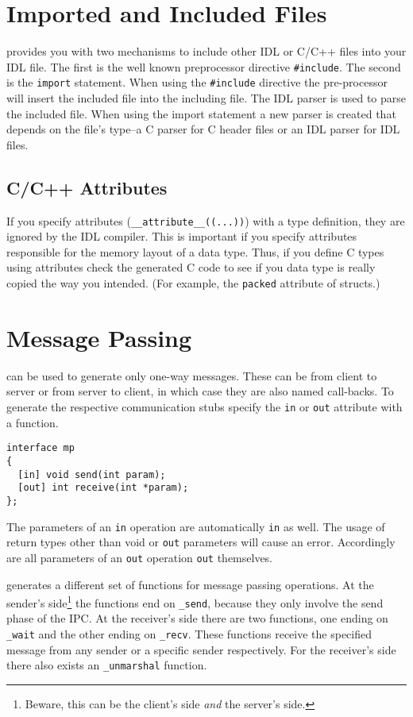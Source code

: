 \section{Imported and Included Files}
\label{sec:import}

\dice{} provides you with two mechanisms to include other IDL or C/C++ files
into your IDL file. The first is the well known preprocessor directive
\verb|#include|. The second is the \verb|import| statement.  When using the
\verb|#include| directive the pre-processor will insert the included file into
the including file.  The IDL parser is used to parse the included file.  When
using the import statement a new parser is created that depends on the file's
type--a C parser for C header files or an IDL parser for IDL files.

\subsection{C/C++ Attributes}

If you specify attributes (\verb|__attribute__((...))|) with a type
definition, they are ignored by the IDL compiler. This is important if you
specify attributes responsible for the memory layout of a data type. Thus, if
you define C types using attributes check the generated C code to see if you
data type is really copied the way you intended. (For example, the
\verb|packed| attribute of structs.)

\section{Message Passing}
\label{sec:message-passing}

\dice{} can be used to generate only one-way messages.  These can be from
client to server or from server to client, in which case they are also named
call-backs.  To generate the respective communication stubs specify the
\verb|in| or \verb|out| attribute with a function.

\begin{verbatim}
interface mp
{
  [in] void send(int param);
  [out] int receive(int *param);
};
\end{verbatim}

The parameters of an \verb|in| operation are automatically \verb|in| as
well. The usage of return types other than void or \verb|out| parameters
will cause an error. Accordingly are all parameters of an \verb|out|
operation \verb|out| themselves.

\dice{} generates a different set of functions for message passing
operations. At the sender's side\footnote{Beware, this can be the client's
side \emph{and} the server's side.} the functions end on \verb|_send|, because
they only involve the send phase of the IPC. At the receiver's side
there are two functions, one ending on \verb|_wait| and the other ending
on \verb|_recv|. These functions receive the specified message from
any sender or a specific sender respectively. For the receiver's side
there also exists an \verb|_unmarshal| function.

